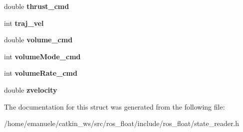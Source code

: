 \begin{DoxyCompactItemize}
double {\bfseries thrust\+\_\+cmd}
\item 
\mbox{\label{structSTATE__DATA_a2fe9d007e49bedc27037931ff307bc4f}} 
int {\bfseries traj\+\_\+vel}
\item 
\mbox{\label{structSTATE__DATA_a8e0aadd94228f9699cf549140e0885a0}} 
double {\bfseries volume\+\_\+cmd}
\item 
\mbox{\label{structSTATE__DATA_a85de3f890ca5acb2a52217771c4b8d38}} 
int {\bfseries volume\+Mode\+\_\+cmd}
\item 
\mbox{\label{structSTATE__DATA_a39ee702b4f2a8b4377d412a65e576074}} 
int {\bfseries volume\+Rate\+\_\+cmd}
\item 
\mbox{\label{structSTATE__DATA_a4537a3b7fec92e2099c7ba2674a644e6}} 
double {\bfseries zvelocity}
\end{DoxyCompactItemize}


The documentation for this struct was generated from the following file\+:\begin{DoxyCompactItemize}
\item 
/home/emanuele/catkin\+\_\+ws/src/ros\+\_\+float/include/ros\+\_\+float/state\+\_\+reader.\+h\end{DoxyCompactItemize}
